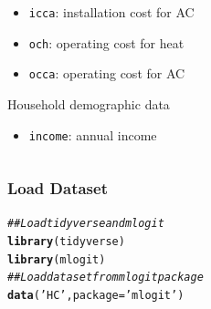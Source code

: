 \documentclass{beamer}\usepackage[]{graphicx}\usepackage[]{color}
\makeatletter
\newcommand{\hlstr}[1]{\textcolor[rgb]{0.192,0.494,0.8}{#1}}%
\newcommand{\hlcom}[1]{\textcolor[rgb]{0.678,0.584,0.686}{\textit{#1}}}%
\newcommand{\hlstd}[1]{\textcolor[rgb]{0.345,0.345,0.345}{#1}}%
\newcommand{\hlkwc}[1]{\textcolor[rgb]{0.333,0.667,0.333}{#1}}%
\newcommand{\hlkwd}[1]{\textcolor[rgb]{0.737,0.353,0.396}{\textbf{#1}}}%
\newenvironment{kframe}{%
 \def\at@end@of@kframe{}%
 \ifinner\ifhmode%
  \def\at@end@of@kframe{\end{minipage}}%
  \begin{minipage}{\columnwidth}%
 \fi\fi%
 \def\FrameCommand##1{\hskip\@totalleftmargin \hskip-\fboxsep
 \colorbox{shadecolor}{##1}\hskip-\fboxsep
     \hskip-\linewidth \hskip-\@totalleftmargin \hskip\columnwidth}%
 \MakeFramed {\advance\hsize-\width
   \@totalleftmargin\z@ \linewidth\hsize
   \@setminipage}}%
 {\par\unskip\endMakeFramed%
 \at@end@of@kframe}
\newenvironment{knitrout}{}{} %
\makeatother
\begin{document}
\begin{frame}
\begin{columns}
\begin{column}{0.5\textwidth}
\begin{itemize}
                \item \texttt{icca}: installation cost for AC
                \item \texttt{och}: operating cost for heat
                \item \texttt{occa}: operating cost for AC
            \end{itemize}
            \vspace{2ex}
            Household demographic data
            \begin{itemize}
                \item \texttt{income}: annual income
            \end{itemize}
            \vspace{1ex}
        \end{column}
    \end{columns}
\end{frame}

\begin{frame}[fragile]\frametitle{Load Dataset}
\begin{knitrout}\footnotesize
{}\color{fgcolor}\begin{kframe}
\begin{alltt}
\hlcom{## Load tidyverse and mlogit}
\hlkwd{library}\hlstd{(tidyverse)}
\hlkwd{library}\hlstd{(mlogit)}
\hlcom{## Load dataset from mlogit package}
\hlkwd{data}\hlstd{(}\hlstr{'HC'}\hlstd{,} \hlkwc{package} \hlstd{=} \hlstr{'mlogit'}\hlstd{)}
\end{alltt}
\end{kframe}
\end{knitrout}
\end{frame}
\end{document}
